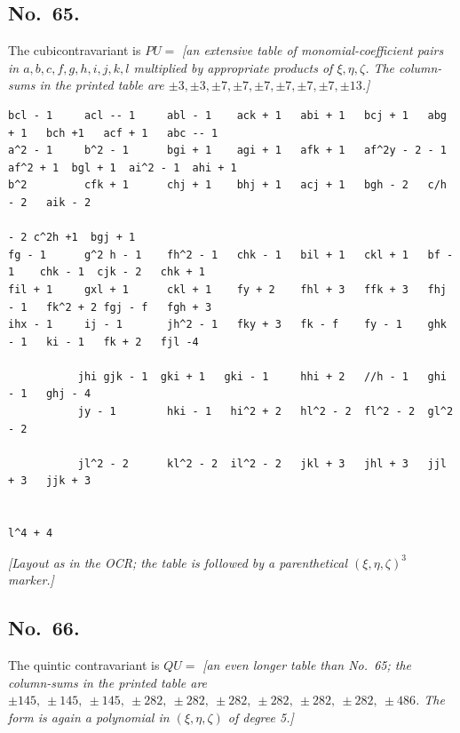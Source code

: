 \documentclass[11pt]{article}
\begin{document}
\subsection*{No.\ 65.}
The cubicontravariant is $PU =$ \textit{[an extensive table of monomial-coefficient pairs in $a, b, c, f, g, h, i, j, k, l$ multiplied by appropriate products of $\xi, \eta, \zeta$. The column-sums in the printed table are $\pm 3, \pm 3, \pm 7, \pm 7, \pm 7, \pm 7, \pm 7, \pm 7, \pm 13$.]}

\smallskip

\begin{scriptsize}
\begin{verbatim}
bcl - 1     acl -- 1     abl - 1    ack + 1   abi + 1   bcj + 1   abg + 1   bch +1   acf + 1   abc -- 1
a^2 - 1     b^2 - 1      bgi + 1    agi + 1   afk + 1   af^2y - 2 - 1 af^2 + 1  bgl + 1  ai^2 - 1  ahi + 1
b^2         cfk + 1      chj + 1    bhj + 1   acj + 1   bgh - 2   c/h - 2   aik - 2
                                                                          - 2 c^2h +1  bgj + 1
fg - 1      g^2 h - 1    fh^2 - 1   chk - 1   bil + 1   ckl + 1   bf - 1    chk - 1  cjk - 2   chk + 1
fil + 1     gxl + 1      ckl + 1    fy + 2    fhl + 3   ffk + 3   fhj - 1   fk^2 + 2 fgj - f   fgh + 3
ihx - 1     ij - 1       jh^2 - 1   fky + 3   fk - f    fy - 1    ghk - 1   ki - 1   fk + 2   fjl -4

           jhi gjk - 1  gki + 1   gki - 1     hhi + 2   //h - 1   ghi - 1   ghj - 4
           jy - 1        hki - 1   hi^2 + 2   hl^2 - 2  fl^2 - 2  gl^2 - 2

           jl^2 - 2      kl^2 - 2  il^2 - 2   jkl + 3   jhl + 3   jjl + 3   jjk + 3

                                                                            l^4 + 4
\end{verbatim}
\end{scriptsize}

\textit{[Layout as in the OCR; the table is followed by a parenthetical $(\xi,\eta,\zeta)^3$ marker.]}

\bigskip

\subsection*{No.\ 66.}
The quintic contravariant is $QU =$ \textit{[an even longer table than No.\ 65; the column-sums in the printed table are $\pm 145,\ \pm 145,\ \pm 145,\ \pm 282,\ \pm 282,\ \pm 282,\ \pm 282,\ \pm 282,\ \pm 282,\ \pm 486$. The form is again a polynomial in $(\xi,\eta,\zeta)$ of degree 5.]}
\end{document}
